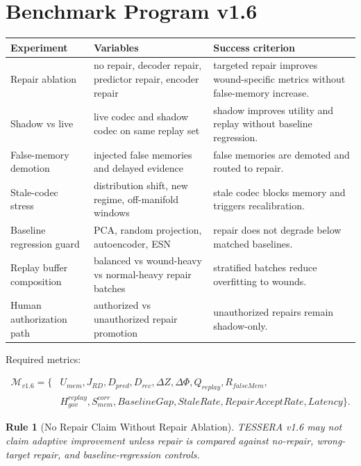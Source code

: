 \documentclass[12pt]{article}
\newtheorem{rulebox}{Rule}
\begin{document}
\section{Benchmark Program v1.6}

\begin{longtable}{p{}p{}p{}}
\toprule
\textbf{Experiment} & \textbf{Variables} & \textbf{Success criterion} \\
\midrule
Repair ablation & no repair, decoder repair, predictor repair, encoder repair & targeted repair improves wound-specific metrics without false-memory increase. \\
Shadow vs live & live codec and shadow codec on same replay set & shadow improves utility and replay without baseline regression. \\
False-memory demotion & injected false memories and delayed evidence & false memories are demoted and routed to repair. \\
Stale-codec stress & distribution shift, new regime, off-manifold windows & stale codec blocks memory and triggers recalibration. \\
Baseline regression guard & PCA, random projection, autoencoder, ESN & repair does not degrade below matched baselines. \\
Replay buffer composition & balanced vs wound-heavy vs normal-heavy repair batches & stratified batches reduce overfitting to wounds. \\
Human authorization path & authorized vs unauthorized repair promotion & unauthorized repairs remain shadow-only. \\
\bottomrule
\end{longtable}

Required metrics:

\[
\begin{aligned}
\mathcal{M}_{v1.6}=\{&U_{mem},J_{RD},D_{pred},D_{rec},\Delta Z,\Delta\Phi,
Q_{replay},R_{falseMem},\\
&H^{replay}_{gov},S^{corr}_{mem},BaselineGap,StaleRate,RepairAcceptRate,Latency\}.
\end{aligned}
\]

\begin{rulebox}[No Repair Claim Without Repair Ablation]
TESSERA v1.6 may not claim adaptive improvement unless repair is compared
against no-repair, wrong-target repair, and baseline-regression controls.
\end{rulebox}
\end{document}
